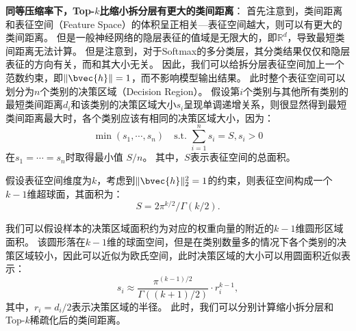 \textbf{同等压缩率下，Top-$k$比缩小拆分层有更大的类间距离}：
首先注意到，类间距离和表征空间（Feature Space）的体积呈正相关---表征空间越大，则可以有更大的类间距离。
%
但是一般神经网络的隐层表征的值域是无限大的，即$\mathbb R^d$，导致最短类间距离无法计算。
%
但是注意到，对于Softmax的多分类层，其分类结果仅仅和隐层表征的方向有关，而和其大小无关。
%
因此，我们可以给拆分层表征空间加上一个范数约束，即$\Vert \bvec{h} \Vert = 1$，而不影响模型输出结果。
%
此时整个表征空间可以划分为$n$个类别的决策区域（Decision Region）。
假设第$i$个类别与其他所有类别的最短类间距离$d_i$和该类别的决策区域大小$s_i$呈现单调递增关系，则很显然得到最短类间距离最大时，各个类别应该有相同的决策区域大小，因为：
\begin{equation}
    \min (s_1, \cdots, s_n) \quad \text{s.t. } {\sum_{i=1}^n s_i = S, s_i > 0}
\end{equation}
在$s_1 = \cdots = s_n$时取得最小值 $S/n$。
其中，$S$表示表征空间的总面积。

假设表征空间维度为$k$，考虑到$\Vert \bvec{h} \Vert^2_2 = 1$的约束，则表征空间构成一个$k-1$维超球面，其面积为：
\begin{equation}
    S = 2\pi^{k/2}/\Gamma(k/2).
\end{equation}



我们可以假设样本的决策区域面积约为对应的权重向量的附近的$k-1$维圆形区域面积。
该圆形落在$k-1$维的球面空间，但是在类别数量多的情况下各个类别的决策区域较小，因此可以近似为欧氏空间，此时决策区域的大小可以用圆面积近似表示：
\begin{equation}
    s_i \approx \dfrac{\pi^{(k-1)/2}}{\Gamma((k+1)/2)} \cdot r_i^{k-1},
\end{equation}
其中，$r_i = d_i/2$表示决策区域的半径。
%
此时，我们可以分别计算缩小拆分层和Top-$k$稀疏化后的类间距离。



